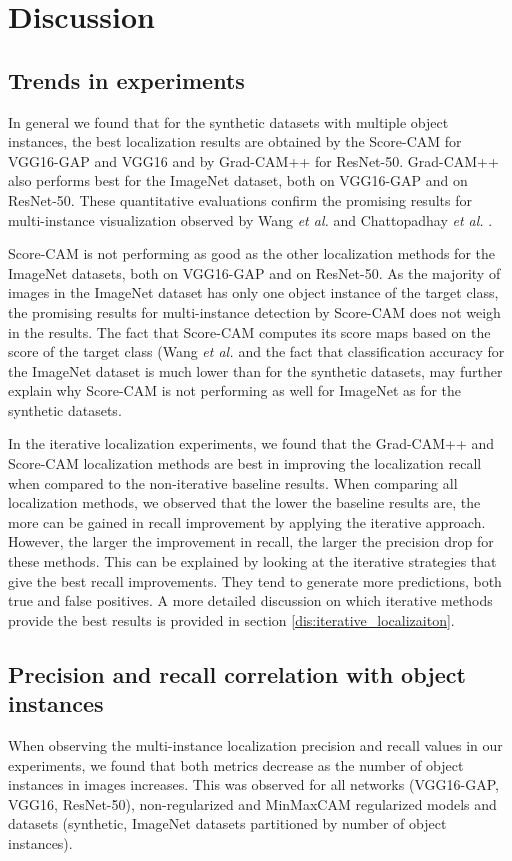 \chapter{Discussion} \label{ch:discussion}

\section{Trends in experiments}
In general we found that for the synthetic datasets with multiple object instances, the best localization results are obtained by the Score-CAM for VGG16-GAP and VGG16 and by Grad-CAM++ for ResNet-50. Grad-CAM++ also performs best for the ImageNet dataset, both on VGG16-GAP and on ResNet-50. These quantitative evaluations confirm the promising results for multi-instance visualization observed by Wang \textit{et al.} \cite{wang2020score} and Chattopadhay \textit{et al.} \cite{chattopadhay2018grad}.

Score-CAM is not performing as good as the other localization methods for the ImageNet datasets, both on VGG16-GAP and on ResNet-50. As the majority of images in the ImageNet dataset has only one object instance of the target class, the promising results for multi-instance detection by Score-CAM does not weigh in the results. The fact that Score-CAM computes its score maps based on the score of the target class (Wang \textit{et al. \cite{wang2020score}} and the fact that classification accuracy for the ImageNet dataset is much lower than for the synthetic datasets, may further explain why Score-CAM is not performing as well for ImageNet as for the synthetic datasets.

In the iterative localization experiments, we found that the Grad-CAM++ and Score-CAM localization methods are best in improving the localization recall when compared to the non-iterative baseline results. When comparing all localization methods, we observed that the lower the baseline results are, the more can be gained in recall improvement by applying the iterative approach. However, the larger the improvement in recall, the larger the precision drop for these methods. This can be explained by looking at the iterative strategies that give the best recall improvements. They tend to generate more predictions, both true and false positives. A more detailed discussion on which iterative methods provide the best results is provided in section \ref{dis:iterative_localizaiton}.

\section{Precision and recall correlation with object instances}
When observing the multi-instance localization precision and recall values in our experiments, we found that both metrics decrease as the number of object instances in images increases. This was observed for all networks (VGG16-GAP, VGG16, ResNet-50), non-regularized and MinMaxCAM regularized models and datasets (synthetic, ImageNet datasets partitioned by number of object instances).

